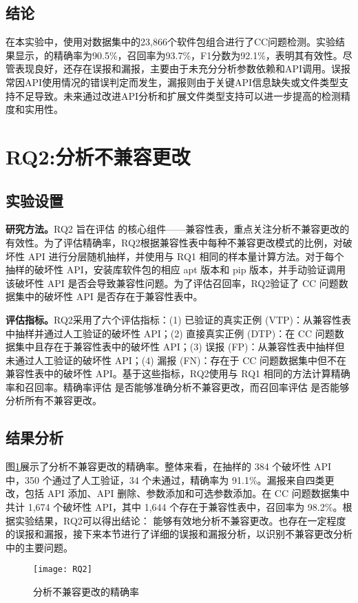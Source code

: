 \subsection{结论}
在本实验中，使用\tool{}对数据集中的23,866个软件包组合进行了CC问题检测。实验结果显示，\tool{}的精确率为90.5\%，召回率为93.7\%，F1分数为92.1\%，表明其有效性。尽管表现良好，\tool{}还存在误报和漏报，主要由于未充分分析参数依赖和API调用。误报常因API使用情况的错误判定而发生，漏报则由于关键API信息缺失或文件类型支持不足导致。未来通过改进API分析和扩展文件类型支持可以进一步提高\tool{}的检测精度和实用性。

\section{RQ2:分析不兼容更改}
\subsection{实验设置}
\textbf{研究方法。}RQ2 旨在评估 \tool{} 的核心组件——兼容性表，重点关注分析不兼容更改的有效性。为了评估精确率，RQ2根据兼容性表中每种不兼容更改模式的比例，对破坏性 API 进行分层随机抽样，并使用与 RQ1 相同的样本量计算方法。对于每个抽样的破坏性 API，安装库软件包的相应 apt 版本和 pip 版本，并手动验证调用该破坏性 API 是否会导致兼容性问题。为了评估召回率，RQ2验证了 CC 问题数据集中的破坏性 API 是否存在于兼容性表中。

\textbf{评估指标。}RQ2采用了六个评估指标：(1) 已验证的真实正例 (VTP)：从兼容性表中抽样并通过人工验证的破坏性 API；(2) 直接真实正例 (DTP)：在 CC 问题数据集中且存在于兼容性表中的破坏性 API；(3) 误报 (FP)：从兼容性表中抽样但未通过人工验证的破坏性 API；(4) 漏报 (FN)：存在于 CC 问题数据集中但不在兼容性表中的破坏性 API。基于这些指标，RQ2使用与 RQ1 相同的方法计算精确率和召回率。精确率评估 \tool{} 是否能够准确分析不兼容更改，而召回率评估 \tool{} 是否能够分析所有不兼容更改。
\subsection{结果分析}
图\ref{fig:RQ5-1}展示了\tool{}分析不兼容更改的精确率。整体来看，在抽样的 384 个破坏性 API 中，350 个通过了人工验证，34 个未通过，精确率为 91.1\%。漏报来自四类更改，包括 API 添加、API 删除、参数添加和可选参数添加。在 CC 问题数据集中共计 1,674 个破坏性 API，其中 1,644 个存在于兼容性表中，召回率为 98.2\%。根据实验结果，RQ2可以得出结论：\tool{} 能够有效地分析不兼容更改。\tool{}也存在一定程度的误报和漏报，接下来本节进行了详细的误报和漏报分析，以识别不兼容更改分析中的主要问题。
\begin{figure}[htbp]
	\centering
	\texttt{[image: RQ2]}
	\label{fig:RQ5-1}
	\caption{\tool{}分析不兼容更改的精确率}
\end{figure}

